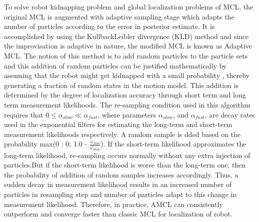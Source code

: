 \documentclass[journal,twoside]{IEEEtran}
\begin{document}
\par\noindent To solve robot kidnapping problem and global localization problems of MCL, the original MCL is augmented with adaptive sampling stage which adapts the number of particles according to the error in posterior estimate. It is accomplished by using the KullbackLeibler divergence (KLD) method and since the improvisation is adaptive in nature, the modified MCL is known as Adaptive MCL. The notion of this method is to add random particles to the particle sets and this addition of random particles can be justified mathematically by assuming that the robot might get kidnapped with a small probability , thereby generating a fraction of random states in the motion model. This addition is determined by the degree of localization accuracy through short term and long term measurement likelihoods. The re-sampling condition used in this algorithm requires that $0\leq\alpha_{slow}\ll\alpha_{fast}$, where parameters $\alpha_{slow}$, and $\alpha_{fast}$, are decay rates used in the exponential filters for estimating the long-term and short-term measurement likelihoods respectively. A random sample is dded based on the probability max(0 : 0; 1.0 - $\frac{\omega_{fast}}{\omega_{slow}}$). If the short-term likelihood approximates the long-term likelihood, re-sampling occurs normally without any extra injection of particles.But if the short-term likelihood is worse than the long-term one, then the probability of addition of random samples increases accordingly. Thus, a sudden decay in measurement likelihood results in an increased number of particles in resampling step and number of particles adapt to this change in measurement likelihood. Therefore, in practice, AMCL can consistently outperform and converge faster than classic MCL for localization of robot.
\end{document}
